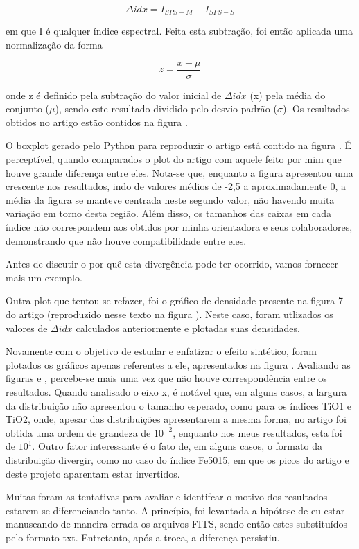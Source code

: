 \documentclass[12pt]{projeto}
\begin{document}
\[\Delta idx = I_{SPS-M} - I_{SPS-S}\]

em que I é qualquer índice espectral. Feita esta subtração, foi então aplicada uma normalização da forma

\[z = \frac{x-\mu}{\sigma}\]

onde z é definido pela subtração do valor inicial de \(\Delta idx\) (x) pela média do conjunto (\(\mu\)), sendo este resultado dividido pelo desvio padrão (\(\sigma\)). Os resultados obtidos no artigo estão contidos na figura .

O boxplot gerado pelo Python para reproduzir o artigo está contido na figura .
É perceptível, quando comparados o plot do artigo com aquele feito por mim que houve grande diferença entre eles. Nota-se que, enquanto a figura  apresentou uma crescente nos resultados, indo de valores médios de -2,5 a aproximadamente 0, a média da figura  se manteve centrada neste segundo valor, não havendo muita variação em torno desta região. Além disso, os tamanhos das caixas em cada índice não correspondem aos obtidos por minha orientadora e seus colaboradores, demonstrando que não houve compatibilidade entre eles.

Antes de discutir o por quê esta divergência pode ter ocorrido, vamos fornecer mais um exemplo.

Outra plot que tentou-se refazer, foi o gráfico de densidade presente na figura 7 do artigo (reproduzido nesse texto na figura ). Neste caso, foram utlizados os valores de \(\Delta idx\) calculados anteriormente e plotadas suas densidades.

Novamente com o objetivo de estudar e enfatizar o efeito sintético, foram plotados os gráficos apenas referentes a ele, apresentados na figura .
Avaliando as figuras e , percebe-se mais uma vez que não houve correspondência entre os resultados. Quando analisado o eixo x, é notável que, em alguns casos, a largura da distribuição não apresentou o tamanho esperado, como para os índices TiO1 e TiO2, onde, apesar das distribuições apresentarem a mesma forma, no artigo foi obtida uma ordem de grandeza de \(10^{-2}\), enquanto nos meus resultados, esta foi de \(10^1\). Outro fator interessante é o fato de, em alguns casos, o formato da distribuição divergir, como no caso do índice Fe5015, em que os picos do artigo e deste projeto aparentam estar invertidos. 

Muitas foram as tentativas para avaliar e identifcar o motivo dos resultados estarem se diferenciando tanto. A princípio, foi levantada a hipótese de eu estar manuseando de maneira errada os arquivos FITS, sendo então estes substituídos pelo formato txt. Entretanto, após a troca, a diferença persistiu.
\end{document}
